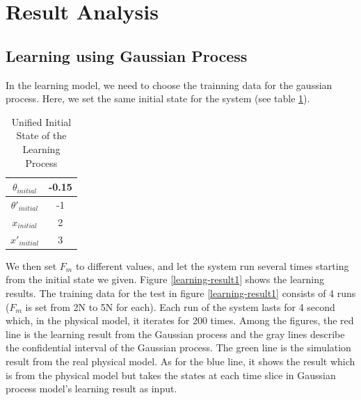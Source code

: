 \documentclass[11pt,twoside,a4paper]{article}
\begin{document}
\section{Result Analysis}
\subsection{Learning using Gaussian Process}
In the learning model, we need to choose the trainning data for the
gaussian process. Here, we set the same initial state for the system
(see table \ref{tab:initial}).
\begin{table}
\centering
\begin{tabular}{c|c}
\hline
$\theta_{initial}$ & -0.15 \\ \hline
$\theta'_{initial}$ & -1 \\ \hline
$x_{initial}$ & 2 \\ \hline
$x'_{initial}$ & 3 \\ \hline
\end{tabular}
\caption{Unified Initial State of the Learning Process}
\label{tab:initial}
\end{table}
We then set $F_m$ to different values, and let the system run several
times starting from the initial state we given. Figure
\ref{learning-result1} shows the learning results. The training data
for the test in figure \ref{learning-result1} consists of 4 runs
($F_m$ is set from 2N to 5N for each). Each run of the system lasts
for 4 second which, in the physical model, it iterates for 200
times. Among the figures, the {\color{red}red line} is the learning
result from the Gaussian process and the {\color{light-gray} gray lines}
describe the confidential interval of the Gaussian process. The
{\color{green}green line} is the simulation result from the real
physical model. As for the {\color{blue} blue line}, it shows the
result which is from the physical model but takes the states at each
time slice in Gaussian process model's learning result as input.\\
\end{document}
